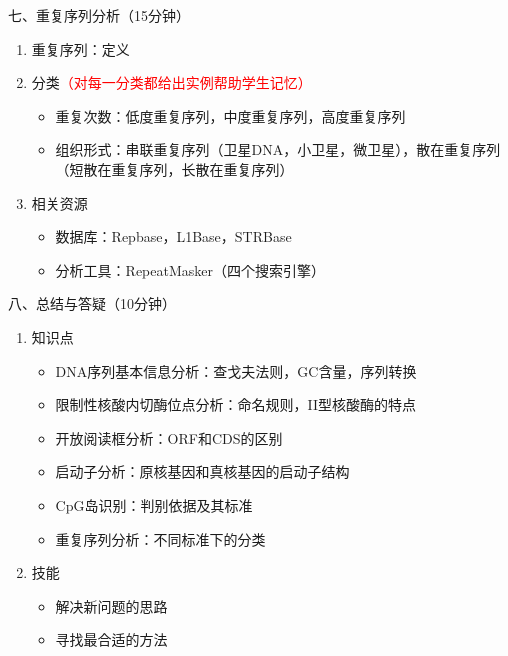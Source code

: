 \documentclass{TIJMUjiaoanLL}
\begin{document}
\noindent
七、重复序列分析（15分钟）
\begin{enumerate}
  \item 重复序列：定义
  \item 分类\textcolor{red}{（对每一分类都给出实例帮助学生记忆）}
    \begin{itemize}
      \item 重复次数：低度重复序列，中度重复序列，高度重复序列
      \item 组织形式：串联重复序列（卫星DNA，小卫星，微卫星），散在重复序列（短散在重复序列，长散在重复序列）
    \end{itemize}
  \item 相关资源
    \begin{itemize}
      \item 数据库：Repbase，L1Base，STRBase
      \item 分析工具：RepeatMasker（四个搜索引擎）
    \end{itemize}
\end{enumerate}

\noindent
八、总结与答疑（10分钟）
\begin{enumerate}
  \item 知识点
    \begin{itemize}
      \item DNA序列基本信息分析：查戈夫法则，GC含量，序列转换
      \item 限制性核酸内切酶位点分析：命名规则，II型核酸酶的特点
      \item 开放阅读框分析：ORF和CDS的区别
      \item 启动子分析：原核基因和真核基因的启动子结构
      \item CpG岛识别：判别依据及其标准
      \item 重复序列分析：不同标准下的分类
    \end{itemize}
  \item 技能
    \begin{itemize}
      \item 解决新问题的思路
      \item 寻找最合适的方法
    \end{itemize}
\end{enumerate}

\otherTail
\end{document}
